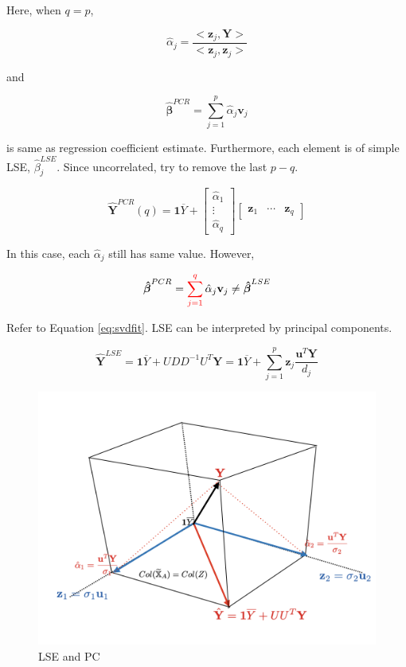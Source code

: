 \documentclass[]{book}
\theoremstyle{definition}
\theoremstyle{definition}
\theoremstyle{definition}
\theoremstyle{remark}
\begin{document}
Here, when \(q = p\),

\[\hat\alpha_j = \frac{< \mathbf{z}_j, \mathbf{Y} >}{< \mathbf{z}_j, \mathbf{z}_j >}\]

and

\[\boldsymbol{\hat\beta}^{PCR} = \sum_{j = 1}^p \hat\alpha_j \mathbf{v}_j\]

is same as regression coefficient estimate. Furthermore, each element is of simple LSE, \(\hat\beta_j^{LSE}\). Since uncorrelated, try to remove the last \(p - q\).

\[
\hat{\mathbf{Y}}^{PCR}(q) = \mathbf{1} \overline{Y} + \begin{bmatrix}
  \hat\alpha_1 \\
  \vdots \\
  \hat\alpha_q
\end{bmatrix} \begin{bmatrix}
  \mathbf{z}_1 & \cdots & \mathbf{z}_q
\end{bmatrix}
\]

In this case, each \(\hat\alpha_j\) still has same value. However,

\[\boldsymbol{\hat\beta}^{PCR} = \sum_{j = 1}^{\color{red}{q}} \hat\alpha_j \mathbf{v}_j \neq \boldsymbol{\hat\beta}^{LSE}\]

Refer to Equation \eqref{eq:svdfit}. LSE can be interpreted by principal components.

\[\hat{\mathbf{Y}}^{LSE} = \mathbf{1} \overline{Y} + UDD^{-1} U^T \mathbf{Y} = \mathbf{1} \overline{Y} + \sum_{j = 1}^p \mathbf{z}_j \frac{\mathbf{u}^T \mathbf{Y}}{d_j}\]

\begin{figure}[H]

{\centering \includegraphics[width=0.7\linewidth]{images/pcrlse} 

}

\caption{LSE and PC}\label{fig:lsepc}
\end{figure}
\end{document}
